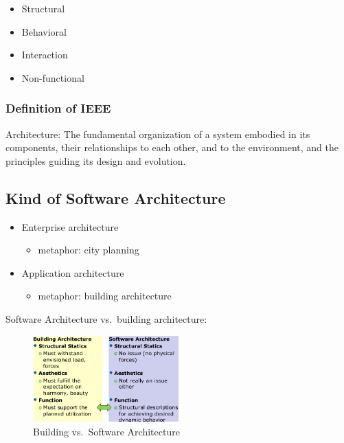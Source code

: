 \begin{itemize}
\tightlist
\item
  Structural
\item
  Behavioral
\item
  Interaction
\item
  Non-functional
\end{itemize}

\hypertarget{definition-of-ieee}{%
\subsubsection{Definition of IEEE}\label{definition-of-ieee}}

Architecture: The fundamental organization of a system embodied in its
components, their relationships to each other, and to the environment,
and the principles guiding its design and evolution.

\hypertarget{kind-of-software-architecture}{%
\subsection{Kind of Software
Architecture}\label{kind-of-software-architecture}}

\begin{itemize}
\tightlist
\item
  Enterprise architecture

  \begin{itemize}
  \tightlist
  \item
    metaphor: city planning
  \end{itemize}
\item
  Application architecture

  \begin{itemize}
  \tightlist
  \item
    metaphor: building architecture
  \end{itemize}
\end{itemize}

Software Architecture vs.~building architecture:

\begin{figure}[H]
\centering
\includegraphics[width=0.5\textwidth]{figures/buildingSoftwareArchitecture.png}
\caption{Building vs.~Software Architecture}
\end{figure}

